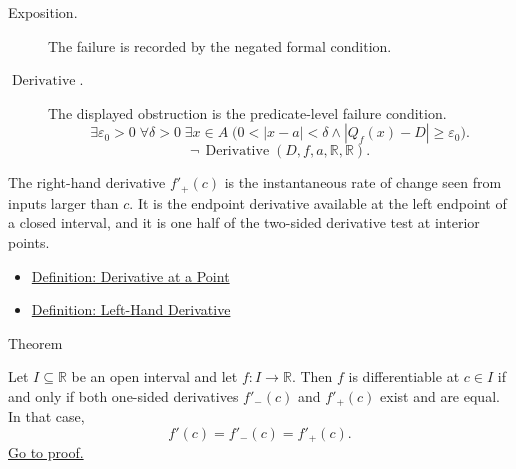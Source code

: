 \begin{remark*}
\begin{description}
  \item[Exposition.]
  The failure is recorded by the negated formal condition.

  \item[\(\operatorname{Derivative}.\)]
  The displayed obstruction is the predicate-level failure condition.
  \[
  \exists\varepsilon_0>0\;\forall\delta>0\;\exists x\in A\;\bigl(0<|x-a|<\delta\land |Q_f(x)-D|\ge\varepsilon_0\bigr).
  \]
  \[
  \neg\,\operatorname{Derivative}(D,f,a,\mathbb{R},\mathbb{R}).
  \]
\end{description}
\end{remark*}


\begin{remark*}[Interpretation]
The right-hand derivative $f'_+(c)$ is the instantaneous rate of change
seen from inputs larger than $c$. It is the endpoint derivative available
at the left endpoint of a closed interval, and it is one half of the
two-sided derivative test at interior points.
\end{remark*}

\begin{dependencies}
\begin{itemize}
  \item \hyperref[def:derivative-at-a-point]{Definition: Derivative at a Point}
  \item \hyperref[def:left-hand-derivative]{Definition: Left-Hand Derivative}
\end{itemize}
\end{dependencies}


\begin{theorembox}{Theorem}
\begin{theorem}
\label{thm:differentiability-and-one-sided-derivatives}
Let $I \subseteq \mathbb{R}$ be an open interval and let $f : I \to \mathbb{R}$. Then $f$ is differentiable at $c \in I$ if and only if both one-sided derivatives $f'_-(c)$ and $f'_+(c)$ exist and are equal. In that case,
\[
f'(c) = f'_-(c) = f'_+(c).
\]
\hyperref[prf:differentiability-and-one-sided-derivatives]{Go to proof.}
\end{theorem}
\end{theorembox}

